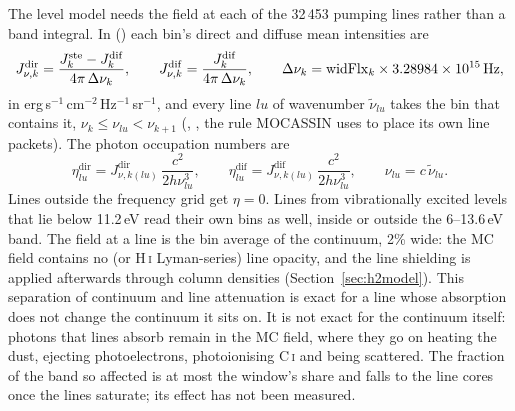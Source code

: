 The level model needs the field at each of the 32\,453 pumping lines rather
than a band integral. In  () each
bin's direct and diffuse mean intensities are
\begin{equation}
  J_{\nu,k}^{\mathrm{dir}} = \frac{J^{\mathrm{ste}}_k-J^{\mathrm{dif}}_k}{4\pi\,\Delta\nu_k},\qquad
  J_{\nu,k}^{\mathrm{dif}} = \frac{J^{\mathrm{dif}}_k}{4\pi\,\Delta\nu_k},\qquad
  \Delta\nu_k = \mathrm{widFlx}_k \times 3.28984\times10^{15}\,\mathrm{Hz},
\end{equation}
in erg\,s$^{-1}$\,cm$^{-2}$\,Hz$^{-1}$\,sr$^{-1}$, and every line $lu$ of wavenumber
$\tilde\nu_{lu}$ takes the bin that contains it, $\nu_k \le \nu_{lu} < \nu_{k+1}$
(, , the rule MOCASSIN uses to place its own line
packets). The photon occupation numbers are
\begin{equation}
  \eta^{\mathrm{dir}}_{lu} = J^{\mathrm{dir}}_{\nu,k(lu)}\,\frac{c^2}{2h\nu_{lu}^3},\qquad
  \eta^{\mathrm{dif}}_{lu} = J^{\mathrm{dif}}_{\nu,k(lu)}\,\frac{c^2}{2h\nu_{lu}^3},
  \qquad \nu_{lu} = c\,\tilde\nu_{lu}.
  \label{eq:eta}
\end{equation}
Lines outside the frequency grid get $\eta=0$. Lines from vibrationally
excited levels that lie below 11.2\,eV read their own bins as well, inside or
outside the 6--13.6\,eV band. The field at a line is the bin average of the
continuum, 2\% wide: the MC field contains no \Htwo{} (or H\,\textsc{i}
Lyman-series) line opacity, and the line shielding is applied afterwards
through column densities (Section~\ref{sec:h2model}). This separation of
continuum and line attenuation is exact for a line whose absorption does not
change the continuum it sits on. It is not exact for the continuum itself:
photons that \Htwo{} lines absorb remain in the MC field, where they go on
heating the dust, ejecting photoelectrons, photoionising C\,\textsc{i} and being
scattered. The fraction of the band so affected is at most the window's share
and falls to the line cores once the lines saturate; its effect has not been
measured.

